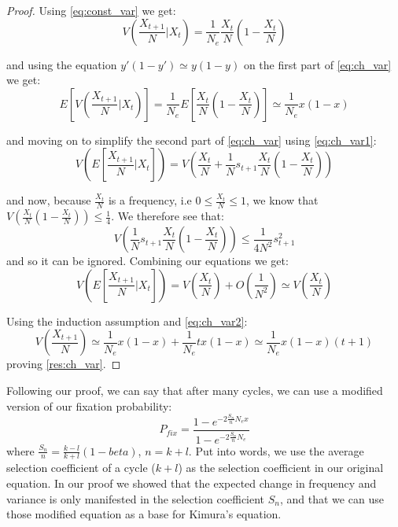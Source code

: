 \documentclass[12pt]{extarticle}
\begin{document}
\begin{proof}
Using \cref{eq:const_var} we get:
\begin{equation}
V\left(\frac{X_{t+1}}{N} \bigg|X_t \right) = \frac{1}{N_e}\frac{X_t}{N}\left(1-\frac{X_t}{N} \right)
\end{equation}

and using the equation $y'(1-y') \simeq y(1-y)$ on the first part of \cref{eq:ch_var} we get:
\begin{equation}\label{eq:ch_var2}
E\left[V\left(\frac{X_{t+1}}{N} \bigg|X_t \right)\right] = \frac{1}{N_e}E\left[\frac{X_t}{N}\left(1- \frac{X_t}{N}\right) \right] \simeq \frac{1}{N_e} x(1-x)
\end{equation}

and moving on to simplify the second part of \cref{eq:ch_var} using \cref{eq:ch_var1}:
\begin{equation}
V\left(E\left[\frac{X_{t+1}}{N} \bigg|X_t \right]\right) = V\left(\frac{X_t}{N} + \frac{1}{N}s_{t+1}\frac{X_t}{N}\left(1-\frac{X_t}{N} \right) \right)
\end{equation}

and now, because $\frac{X_t}{N}$ is a frequency, i.e $0\leq\frac{X_t}{N}\leq1$, we know that $V\left(\frac{X_t}{N}\left(1-\frac{X_t}{N} \right) \right)\leq\frac{1}{4}$. We therefore see that:
\begin{equation}
V\left(\frac{1}{N}s_{t+1}\frac{X_t}{N}\left(1-\frac{X_t}{N} \right) \right)\leq \frac{1}{4N^2}s^2_{t+1}
\end{equation}
and so it can be ignored.
Combining our equations we get:
\begin{equation}
V\left(E\left[\frac{X_{t+1}}{N} \bigg|X_t \right]\right) = V\left(\frac{X_t}{N}\right) + O\left(\frac{1}{N^2}\right)\simeq V\left(\frac{X_t}{N}\right)
\end{equation}

Using the induction assumption and \cref{eq:ch_var2}:
\begin{equation}
V\left(\frac{X_{t+1}}{N}\right) \simeq \frac{1}{N_e}x(1-x) + \frac{1}{N_e}tx(1-x) \simeq \frac{1}{N_e}x(1-x)(t+1)
\end{equation}
proving \cref{res:ch_var}.
\end{proof}

Following our proof, we can say that after many cycles, we can use a modified version of our fixation probability:
\begin{equation}\label{eq:ch_env}
P_{fix} = \frac{1-e^{-2 \frac{S_n}{n} N_e x}}{1-e^{-2 \frac{S_n}{n} N_e}}
\end{equation}
where $\frac{S_n}{n} = \frac{k-l}{k+l}(1-beta)$, $n=k+l$. Put into words, we use the average selection coefficient of a cycle ($k+l$) as the selection coefficient in our original equation.
In our proof we showed that the expected change in frequency and variance is only manifested in the selection coefficient $S_n$, and that we can use those modified equation as a base for Kimura's equation.
\end{document}
